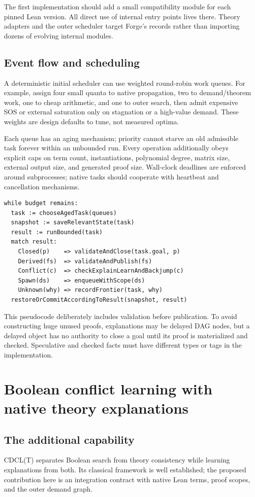 \documentclass[11pt,letterpaper]{article}
\newcommand{\code}[1]{\texttt{\detokenize{#1}}}
\theoremstyle{definition}\newtheorem{definition}[proposition]{Definition}
\begin{document}
The first implementation should add a small compatibility module for each pinned Lean version. All direct use of internal \code{Lean.Meta.Grind} entry points lives there. Theory adapters and the outer scheduler target Forge's records rather than importing dozens of evolving internal modules.

\subsection{Event flow and scheduling}
A deterministic initial scheduler can use weighted round-robin work queues. For example, assign four small quanta to native propagation, two to demand/theorem work, one to cheap arithmetic, and one to outer search, then admit expensive SOS or external saturation only on stagnation or a high-value demand. These weights are design defaults to tune, not measured optima.

Each queue has an aging mechanism; priority cannot starve an old admissible task forever within an unbounded run. Every operation additionally obeys explicit caps on term count, instantiations, polynomial degree, matrix size, external output size, and generated proof size. Wall-clock deadlines are enforced around subprocesses; native tasks should cooperate with heartbeat and cancellation mechanisms.

\begin{lstlisting}
while budget remains:
  task := chooseAgedTask(queues)
  snapshot := saveRelevantState(task)
  result := runBounded(task)
  match result:
    Closed(p)    => validateAndClose(task.goal, p)
    Derived(fs)  => validateAndPublish(fs)
    Conflict(c)  => checkExplainLearnAndBackjump(c)
    Spawn(ds)    => enqueueWithScope(ds)
    Unknown(why) => recordFrontier(task, why)
  restoreOrCommitAccordingToResult(snapshot, result)
\end{lstlisting}

This pseudocode deliberately includes validation before publication. To avoid constructing huge unused proofs, explanations may be delayed DAG nodes, but a delayed object has no authority to close a goal until its proof is materialized and checked. Speculative and checked facts must have different types or tags in the implementation.

\section{Boolean conflict learning with native theory explanations}
\label{sec:cdcl}
\subsection{The additional capability}
CDCL(T) separates Boolean search from theory consistency while learning explanations from both. Its classical framework is well established; the proposed contribution here is an integration contract with native Lean terms, proof scopes, and the outer demand graph.~\cite{dpllt}
\end{document}
